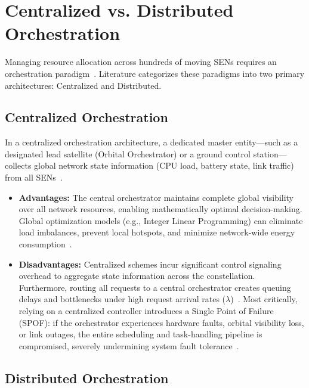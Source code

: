 \section{Centralized vs. Distributed Orchestration}
\label{sec:bg_centralized_vs_distributed}

Managing resource allocation across hundreds of moving SENs requires an orchestration paradigm~\cite{survey_orbital_edge_2023}. Literature categorizes these paradigms into two primary architectures: Centralized and Distributed.

\subsection{Centralized Orchestration}

In a centralized orchestration architecture, a dedicated master entity—such as a designated lead satellite (Orbital Orchestrator) or a ground control station—collects global network state information (CPU load, battery state, link traffic) from all SENs~\cite{survey_orbital_edge_2023, icdcs_satellite_2025}.

\begin{itemize}
    \item \textbf{Advantages:} The central orchestrator maintains complete global visibility over all network resources, enabling mathematically optimal decision-making. Global optimization models (e.g., Integer Linear Programming) can eliminate load imbalances, prevent local hotspots, and minimize network-wide energy consumption~\cite{wolsey1998integer, boyd2004convex}.
    \item \textbf{Disadvantages:} Centralized schemes incur significant control signaling overhead to aggregate state information across the constellation. Furthermore, routing all requests to a central orchestrator creates queuing delays and bottlenecks under high request arrival rates ($\lambda$)~\cite{icdcs_satellite_2025}. Most critically, relying on a centralized controller introduces a Single Point of Failure (SPOF): if the orchestrator experiences hardware faults, orbital visibility loss, or link outages, the entire scheduling and task-handling pipeline is compromised, severely undermining system fault tolerance~\cite{denby2020asplos}.
\end{itemize}

\subsection{Distributed Orchestration}

